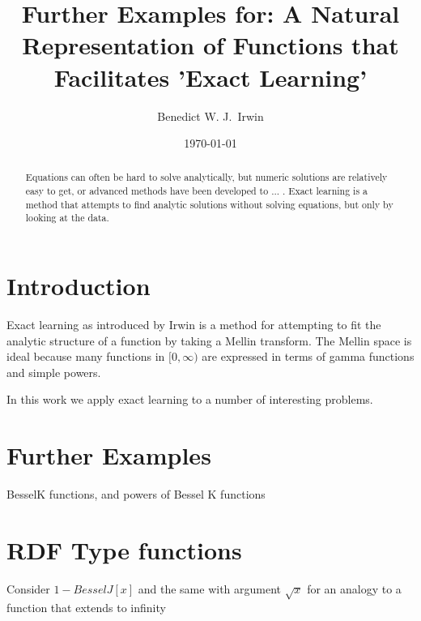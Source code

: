 \documentclass{article}
\title{Further Examples for: A Natural Representation of Functions that Facilitates 'Exact Learning'}
\date{\today}
\begin{document}

\author[1,2]{Benedict W. J.~Irwin}


\maketitle

\begin{abstract}
Equations can often be hard to solve analytically, but numeric solutions are relatively easy to get, or advanced methods have been developed to ... . Exact learning is a method that attempts to find analytic solutions without solving equations, but only by looking at the data. 
\end{abstract}

\section{Introduction}
Exact learning as introduced by Irwin \cite{IrwinCell} is a method for attempting to fit the analytic structure of a function by taking a Mellin transform. The Mellin space is ideal because many functions in $[0,\infty)$ are expressed in terms of gamma functions  and simple powers. 

In this work we apply exact learning to a number of interesting problems. 


\section{Further Examples}

BesselK functions, and powers of Bessel K functions 

\section{RDF Type functions}
Consider $1-BesselJ[x]$ and the same with argument $\sqrt{x}$ for an analogy to a function that extends to infinity
\end{document}
